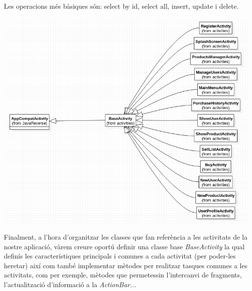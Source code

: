 \documentclass{article}
\begin{document}
Les operacions més bàsiques són: select by id, select all, insert, update i delete.
	\begin{center}
	\includegraphics[scale=0.5]{img/7.png}
\end{center}
	Finalment, a l'hora d'organitzar les classes que fan referència a les activitats de la nostre aplicació, vàrem creure oportú definir una classe base \textit{BaseActivity} la qual definís les característiques principals i comunes a cada activitat (per poder-les heretar) així com també implementar mètodes per realitzar tasques comunes a les activitats, com per exemple, mètodes que permetessin l'intercanvi de fragments, l'actualització d'informació a la \textit{ActionBar...}
	
\begin{center}
\end{center}
\newpage
\end{document}

